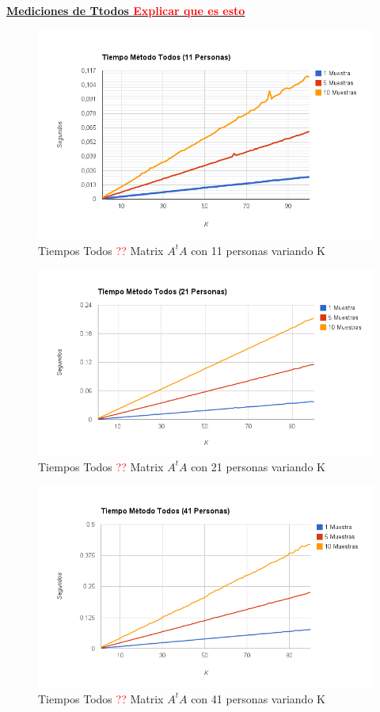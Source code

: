 \underline{\textbf{Mediciones de Ttodos \textcolor{red}{Explicar que es esto}}}

\begin{figure}[H]
\includegraphics[width=1\textwidth]{img/imaged.png}
     \caption{Tiempos Todos \textcolor{red}{??} Matrix $A^tA$ con 11 personas variando K}
     \label{fig:figura1}
\end{figure}

\begin{figure}[H]
\includegraphics[width=1\textwidth]{img/imagee.png}
     \caption{Tiempos Todos \textcolor{red}{??} Matrix $A^tA$ con 21 personas variando K}
     \label{fig:figura1}
\end{figure}

\begin{figure}[H]
\includegraphics[width=1\textwidth]{img/imagef.png}
     \caption{Tiempos Todos \textcolor{red}{??} Matrix $A^tA$ con 41 personas variando K}
     \label{fig:figura1}
\end{figure}

